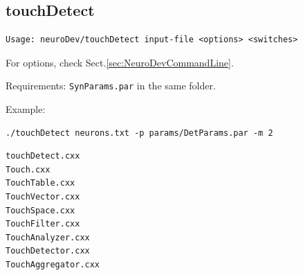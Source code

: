 \subsection{touchDetect}
\label{sec:touchdetect}

{\small
\begin{verbatim}
Usage: neuroDev/touchDetect input-file <options> <switches>

\end{verbatim}
}
For options, check Sect.\ref{sec:NeuroDevCommandLine}.

Requirements: \verb!SynParams.par! in the same folder.

Example:
\begin{verbatim}
./touchDetect neurons.txt -p params/DetParams.par -m 2
\end{verbatim}

% 
%          
% 
% 
%     
\begin{verbatim}
touchDetect.cxx
Touch.cxx
TouchTable.cxx
TouchVector.cxx
TouchSpace.cxx
TouchFilter.cxx
TouchAnalyzer.cxx
TouchDetector.cxx
TouchAggregator.cxx
\end{verbatim}

